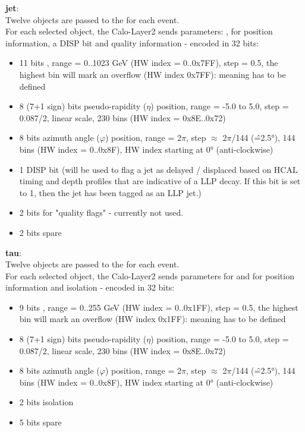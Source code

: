 \textbf{jet}:\\ Twelve objects are passed to the \ugt for each event.\\
For each selected object, the Calo-Layer2 sends parameters: \pt, for position information, a DISP bit and quality information - encoded in 32 bits:
\begin{itemize}
\item 11 bits \pt, range = 0..1023 GeV (HW index = 0..0x7FF), step = 0.5, the highest bin will mark an overflow (HW index 0x7FF): meaning has to be defined
\item 8 (7+1 sign) bits pseudo-rapidity ($\eta$) position, range = -5.0 to 5.0, step = 0.087/2, linear scale, 230 bins (HW index = 0x8E..0x72)
\item 8 bits azimuth angle ($\varphi$) position, range = 2$\pi$, step $\approx$ 2$\pi$/144 (\^=2.5°), 144 bins (HW index = 0..0x8F), HW index starting at 0° (anti-clockwise)
\item 1 DISP bit (will be used to flag a jet as delayed / displaced based on HCAL timing and depth profiles that are indicative of a LLP decay. If this bit is set to 1, then the jet has been tagged as an LLP jet.)
\item 2 bits for "quality flags" - currently not used.
\item 2 bits spare
\end{itemize}

\textbf{tau}:\\ Twelve objects are passed to the \ugt for each event.\\
For each selected object, the Calo-Layer2 sends parameters for \pt and for position information and isolation - encoded in 32 bits:
\begin{itemize}
\item 9 bits \pt, range = 0..255 GeV (HW index = 0..0x1FF), step = 0.5, the highest bin will mark an overflow (HW index 0x1FF): meaning has to be defined
\item 8 (7+1 sign) bits pseudo-rapidity ($\eta$) position, range = -5.0 to 5.0, step = 0.087/2, linear scale, 230 bins (HW index = 0x8E..0x72)
\item 8 bits azimuth angle ($\varphi$) position, range = 2$\pi$, step $\approx$ 2$\pi$/144 (\^=2.5°), 144 bins (HW index = 0..0x8F), HW index starting at 0° (anti-clockwise)
\item 2 bits isolation
\item 5 bits spare
\end{itemize}

